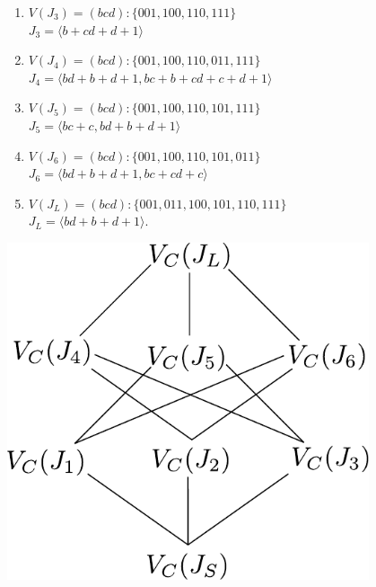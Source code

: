 \begin{Example}
{\begin{minipage}[c]{0.5\textwidth}
{\begin{enumerate}
\item 
 	$V(J_3) = (bcd): \{001,100,110,111\}$ \\
 	$J_3 = \langle b+cd+d+1 \rangle$ 

\item 
 	$V(J_4) = (bcd): \{001,100,110,011,111\}$ \\
 	$J_4 = \langle bd+b+d+1,bc+b+cd+c+d+1 \rangle$ 

\item 
 	$V(J_5) = (bcd): \{001,100,110,101,111\}$ \\
 	$J_5 = \langle bc+c,bd+b+d+1 \rangle$ 

\item 
 	$V(J_6) = (bcd): \{001,100,110,101,011\}$  \\
 	$J_6 = \langle bd+b+d+1,bc+cd+c \rangle$ 

\item $V(J_L) = (bcd): \{001,011,100,101,110,111\}$ \\
$J_L = \langle bd + b + d + 1 \rangle$.

\end{enumerate}
}
\end{minipage}
\hspace{0.3cm}
\begin{minipage}{0.5\textwidth}
\includegraphics[width=0.8\textwidth]{interpolant_lattice.pdf}
\label{Fig:int_lat}
\end{minipage}

}
\end{Example}
